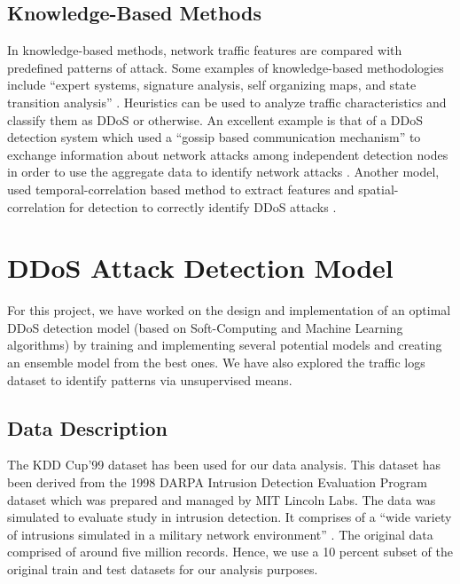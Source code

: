 \subsection{Knowledge-Based Methods}
In knowledge-based methods, network traffic features are compared with predefined patterns of attack. Some examples of knowledge-based
methodologies include ``expert systems, signature analysis, self organizing maps, and state transition analysis'' \cite{monowar01}. Heuristics can be used to analyze traffic characteristics and classify them as DDoS or otherwise. An excellent example is that of a DDoS detection system which used a ``gossip based communication mechanism'' to exchange information about network attacks
among independent detection nodes in order to use the aggregate data to identify network attacks \cite{monowar01}. Another model, used temporal-correlation based method to extract features and spatial-correlation for detection to correctly identify DDoS attacks \cite{monowar01}.

\section{DDoS Attack Detection Model}
For this project, we have worked on the design and implementation of an optimal DDoS detection model (based on Soft-Computing and Machine Learning algorithms) by training and implementing several potential models and creating an ensemble model from the best ones. We have also explored the traffic logs dataset to identify patterns via unsupervised means.

\subsection{Data Description}
The KDD Cup'99 dataset \cite{kdd06} has been used for our data analysis. This dataset has been derived from the 1998 DARPA Intrusion Detection Evaluation Program dataset \cite{linc07} which was prepared and managed by MIT Lincoln Labs. The data was simulated to evaluate study in intrusion detection. It comprises of a ``wide variety of intrusions simulated in a military network environment'' \cite{kdd06}. The original data comprised of around five million records. Hence, we use a 10 percent subset of the original train and test datasets for our analysis purposes.

